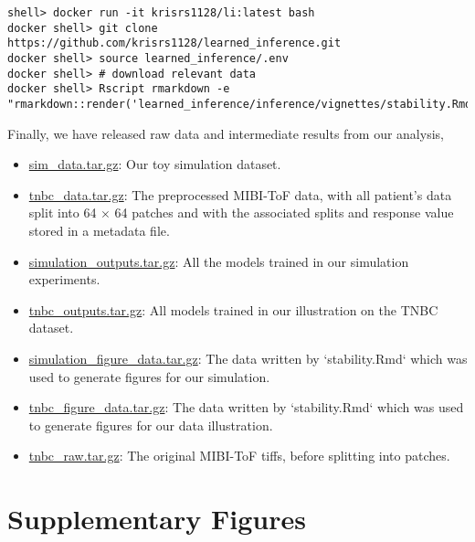 \begin{verbatim}
shell> docker run -it krisrs1128/li:latest bash
docker shell> git clone https://github.com/krisrs1128/learned_inference.git
docker shell> source learned_inference/.env
docker shell> # download relevant data
docker shell> Rscript rmarkdown -e "rmarkdown::render('learned_inference/inference/vignettes/stability.Rmd')"
\end{verbatim}

Finally, we have released raw data and intermediate results from our analysis,

\begin{itemize}
\item
  \href{https://drive.google.com/file/d/1v_Ndux1Rmk2q1ul5Vv5srgI1JQ17Vx0n/view?usp=sharing}{sim\_data.tar.gz}:
  Our toy simulation dataset.
\item \href{https://drive.google.com/file/d/1KMG5yrty8UEPhrR0Y7hIZrtwWuP_y-cm/view?usp=sharing}{tnbc\_data.tar.gz}: The preprocessed MIBI-ToF data, with all
  patient's data split into 64 $\times$ 64 patches and with the associated
  splits and response value stored in a metadata file.
\item \href{https://drive.google.com/file/d/1QVmyqYQCe8C04rAyBQxXuZYuaiYleopx/view?usp=sharing}{simulation\_outputs.tar.gz}: All the models trained in our
  simulation experiments.
\item \href{https://drive.google.com/file/d/1DmzObBWCzVzDNZ1DxcUWgyIoZmC4H8gD/view?usp=sharing}{tnbc\_outputs.tar.gz}: All models trained in our illustration on
  the TNBC dataset.
\item \href{https://drive.google.com/file/d/1zJQOB2dSuy_1WYheJtUI8PZfu9PsyVGQ/view?usp=sharing}{simulation\_figure\_data.tar.gz}: The data written by
  `stability.Rmd` which was used to generate figures for our simulation.
\item \href{https://drive.google.com/file/d/1FaCrOysBlsNYgzul6iJiFcmgRFl2OaSE/view?usp=sharing}{tnbc\_figure\_data.tar.gz}: The data written by `stability.Rmd`
  which was used to generate figures for our data illustration.
\item \href{https://drive.google.com/file/d/1c-ZPs9RbzkY9FzUnCCVJc8syt5dpj-4Y/view?usp=sharing}{tnbc\_raw.tar.gz}:
  The original MIBI-ToF tiffs, before splitting into patches.
\end{itemize}

\section{Supplementary Figures}

